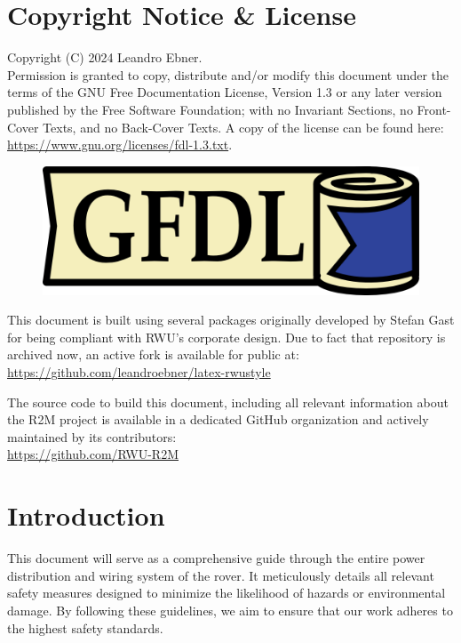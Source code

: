 \section{Copyright Notice \& License}

    Copyright (C)  2024 Leandro Ebner. \\
    Permission is granted to copy, distribute and/or modify this document under the terms of the GNU Free Documentation License, Version 1.3 or any later version published by the Free Software Foundation; with no Invariant Sections, no Front-Cover Texts, and no Back-Cover Texts. A copy of the license can be found here:
    \href{https://www.gnu.org/licenses/fdl-1.3.txt}{https://www.gnu.org/licenses/fdl-1.3.txt}.

    \begin{figure}[h!] %
        \includegraphics{contents/figures/gfdl-logo.png}
    \end{figure}

    \vspace{5mm} %
    
    This document is built using several packages originally developed by Stefan Gast for being compliant with RWU's corporate design. Due to fact that repository is archived now, an active fork is available for public at: \\
    \href{https://github.com/leandroebner/latex-rwustyle}{https://github.com/leandroebner/latex-rwustyle} 

    The source code to build this document, including all relevant information about the R2M project is available in a dedicated GitHub organization and actively maintained by its contributors: \\
    \href{https://github.com/RWU-R2M}{https://github.com/RWU-R2M}

\section{Introduction}

    This document will serve as a comprehensive guide through the entire power distribution and wiring system of the rover. It meticulously details all relevant safety measures designed to minimize the likelihood of hazards or environmental damage. By following these guidelines, we aim to ensure that our work adheres to the highest safety standards. 

